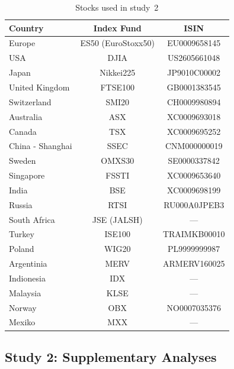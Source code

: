\begin{table}[ht]
\centering\small
\caption{Stocks used in study~2} 
\label{tab:study2_material}
\begin{tabularx}{.6\textwidth}{lcc}
  \toprule
Country & Index Fund & ISIN \\ 
  \midrule
Europe & ES50 (EuroStoxx50) & EU0009658145 \\ 
  USA & DJIA & US2605661048 \\ 
  Japan & Nikkei225 & JP9010C00002 \\ 
  United Kingdom & FTSE100 & GB0001383545 \\ 
  Switzerland & SMI20 & CH0009980894 \\ 
  Australia & ASX & XC0009693018 \\ 
  Canada & TSX & XC0009695252 \\ 
  China - Shanghai & SSEC & CNM000000019 \\ 
  Sweden & OMXS30 & SE0000337842 \\ 
  Singapore & FSSTI & XC0009653640 \\ 
  India & BSE & XC0009698199 \\ 
  Russia & RTSI & RU000A0JPEB3 \\ 
  South Africa & JSE (JALSH) & --- \\ 
  Turkey & ISE100 & TRAIMKB00010 \\ 
  Poland & WIG20 & PL9999999987 \\ 
  Argentinia & MERV & ARMERV160025 \\ 
  Indionesia & IDX & --- \\ 
  Malaysia & KLSE & --- \\ 
  Norway & OBX & NO0007035376 \\ 
  Mexiko & MXX & --- \\ 
   \bottomrule
\end{tabularx}
\end{table}



\subsection{Study 2: Supplementary Analyses}
\label{sup:study2_results}
